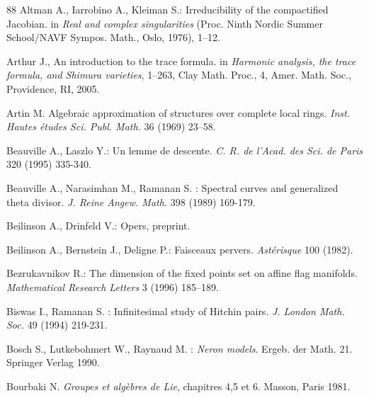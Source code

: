 \documentclass[12pt,english]{smfart}
\numberwithin{equation}{subsection}
\theoremstyle{remark}
\begin{document}
\begin{thebibliography}{88}
 Altman A., Iarrobino A., Kleiman S.: {Irreducibility of
the compactified Jacobian}. in {\em Real and complex
singularities} (Proc. Ninth Nordic Summer School/NAVF Sympos.
Math., Oslo, 1976), 1--12.

 Arthur J., An introduction to the trace formula.
in {\em Harmonic analysis, the trace formula, and Shimura
varieties}, 1--263, Clay Math. Proc., 4, Amer. Math. Soc.,
Providence, RI, 2005.

 Artin M. Algebraic approximation of structures over
    complete local rings. {\em Inst. Hautes \'etudes Sci. Publ. Math.} 36 (1969)
    23--58.

 Beauville A., Laszlo Y.: {Un lemme de descente}.
{\em C. R. de l'Acad. des Sci. de Paris} 320 (1995) 335-340.

 Beauville A., Narasimhan M., Ramanan S. :
{Spectral curves and generalized theta divisor}. {\em J. Reine
Angew. Math.} 398 (1989) 169-179.

 Beilinson A., Drinfeld V.: {Opers}, preprint.

 Beilinson A., Bernstein J., Deligne P.: {Faisceaux pervers.}
    {\em Ast\'e\-risque} 100 (1982).

 Bezrukavnikov R.: {The dimension of the fixed points set
on affine flag manifolds}. {\em Mathematical Research Letters} 3
(1996) 185--189.

 Biswas I., Ramanan S. : {Infinitesimal study of Hitchin
pairs}. {\em J. London Math. Soc.} 49 (1994) 219-231.

 Bosch S., Lutkebohmert W., Raynaud M. : {\em Neron
models}. { Ergeb. der Math.} 21. Springer Verlag 1990.

 Bourbaki N. {\em Groupes et alg\`ebres de Lie},
    chapitres 4,5 et 6. Masson, Paris 1981.


\end{thebibliography}
\end{document}
